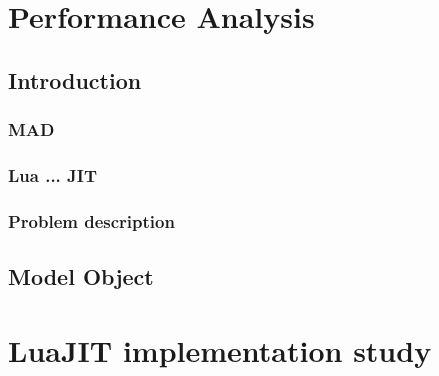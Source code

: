 \documentclass[12pt, oneside]{Thesis}
\begin{document}




\mainmatter
\pagestyle{fancy}

\part{Performance Analysis}
\label{Part:mad}

  \chapter{Introduction}
  \label{Chapt:Intro}

    \section{MAD}
    \label{Sec:mad}
    

    \section{Lua ... JIT}
    \label{Sec:LuaJIT}
    

    \section{Problem description}
    \label{Sec:Problem-description}
    

  \chapter{Model Object}
  \label{Chapt:MO}
  

\part{LuaJIT implementation study}
\label{Part:luajit-doc}
\end{document}

